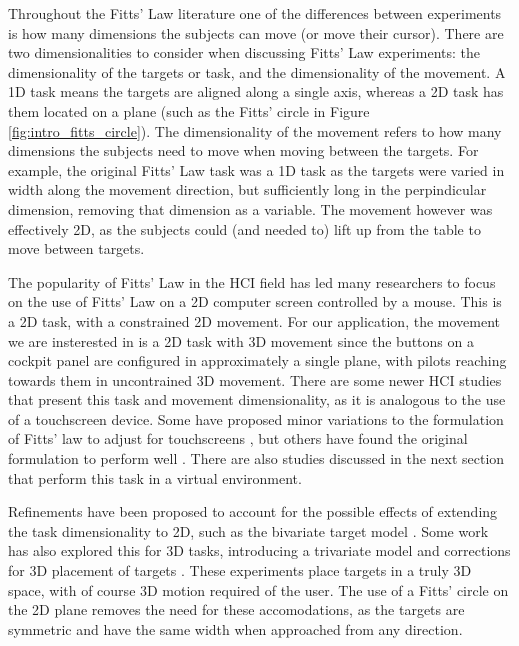 Throughout the Fitts' Law literature one of the differences between experiments is how many dimensions the subjects can move (or move their cursor).
There are two dimensionalities to consider when discussing Fitts' Law experiments: the dimensionality of the targets or task, and the dimensionality of the movement.
A 1D task means the targets are aligned along a single axis, whereas a 2D task has them located on a plane (such as the Fitts' circle in Figure \ref{fig:intro_fitts_circle}).
The dimensionality of the movement refers to how many dimensions the subjects need to move when moving between the targets.
For example, the original Fitts' Law task was a 1D task as the targets were varied in width along the movement direction, but sufficiently long in the perpindicular dimension, removing that dimension as a variable.
The movement however was effectively 2D, as the subjects could (and needed to) lift up from the table to move between targets.

The popularity of Fitts' Law in the HCI field has led many researchers to focus on the use of Fitts' Law on a 2D computer screen controlled by a mouse.
This is a 2D task, with a constrained 2D movement.
For our application, the movement we are insterested in is a 2D task with 3D movement since the buttons on a cockpit panel are configured in approximately a single plane, with pilots reaching towards them in uncontrained 3D movement.
There are some newer HCI studies that present this task and movement dimensionality, as it is analogous to the use of a touchscreen device.
Some have proposed minor variations to the formulation of Fitts' law to adjust for touchscreens \citep{bi_ffitts_2013,sears_high_1991}, but others have found the original formulation to perform well \citep{mackenzie_fitts_2015}.
There are also studies discussed in the next section that perform this task in a virtual environment.

Refinements have been proposed to account for the possible effects of extending the task dimensionality to 2D, such as the bivariate target model \citep{accot_refining_2003, mackenzie_extending_1992, wobbrock_error_2008}.
Some work has also explored this for 3D tasks, introducing a trivariate model \citep{grossman_pointing_2004} and corrections for 3D placement of targets \citep{cha_extended_2013, murata_extending_2001}.
These experiments place targets in a truly 3D space, with of course 3D motion required of the user.
The use of a Fitts' circle on the 2D plane removes the need for these accomodations, as the targets are symmetric and have the same width when approached from any direction.

